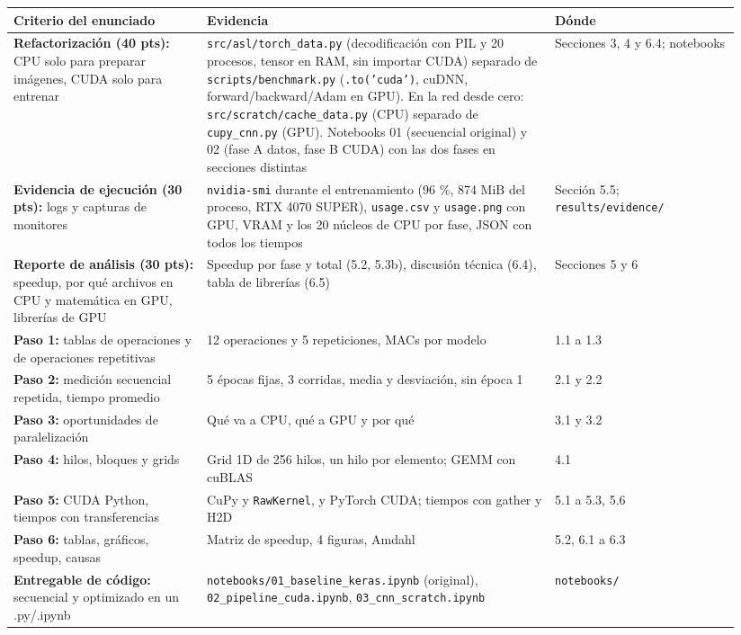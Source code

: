 \documentclass[
  11pt,
]{article}
\begin{document}
\begin{longtable}[]{@{}p{0.25\linewidth}p{0.45\linewidth}p{0.24\linewidth}@{}}
\toprule\noalign{}
Criterio del enunciado & Evidencia & Dónde \\
\midrule\noalign{}
\endhead
\bottomrule\noalign{}
\endlastfoot
\textbf{Refactorización (40 pts):} CPU solo para preparar imágenes, CUDA solo para entrenar & \texttt{src/asl/torch\_data.py} (decodificación con PIL y 20 procesos, tensor en RAM, sin importar CUDA) separado de \texttt{scripts/benchmark.py} (\texttt{.to('cuda')}, cuDNN, forward/backward/Adam en GPU). En la red desde cero: \texttt{src/scratch/cache\_data.py} (CPU) separado de \texttt{cupy\_cnn.py} (GPU). Notebooks 01 (secuencial original) y 02 (fase A datos, fase B CUDA) con las dos fases en secciones distintas & Secciones 3, 4 y 6.4; notebooks \\
\textbf{Evidencia de ejecución (30 pts):} logs y capturas de monitores & \texttt{nvidia-smi} durante el entrenamiento (96 \%, 874 MiB del proceso, RTX 4070 SUPER), \texttt{usage.csv} y \texttt{usage.png} con GPU, VRAM y los 20 núcleos de CPU por fase, JSON con todos los tiempos & Sección 5.5; \texttt{results/evidence/} \\
\textbf{Reporte de análisis (30 pts):} speedup, por qué archivos en CPU y matemática en GPU, librerías de GPU & Speedup por fase y total (5.2, 5.3b), discusión técnica (6.4), tabla de librerías (6.5) & Secciones 5 y 6 \\
\textbf{Paso 1:} tablas de operaciones y de operaciones repetitivas & 12 operaciones y 5 repeticiones, MACs por modelo & 1.1 a 1.3 \\
\textbf{Paso 2:} medición secuencial repetida, tiempo promedio & 5 épocas fijas, 3 corridas, media y desviación, sin época 1 & 2.1 y 2.2 \\
\textbf{Paso 3:} oportunidades de paralelización & Qué va a CPU, qué a GPU y por qué & 3.1 y 3.2 \\
\textbf{Paso 4:} hilos, bloques y grids & Grid 1D de 256 hilos, un hilo por elemento; GEMM con cuBLAS & 4.1 \\
\textbf{Paso 5:} CUDA Python, tiempos con transferencias & CuPy y \texttt{RawKernel}, y PyTorch CUDA; tiempos con gather y H2D & 5.1 a 5.3, 5.6 \\
\textbf{Paso 6:} tablas, gráficos, speedup, causas & Matriz de speedup, 4 figuras, Amdahl & 5.2, 6.1 a 6.3 \\
\textbf{Entregable de código:} secuencial y optimizado en un .py/.ipynb & \texttt{notebooks/01\_baseline\_keras.ipynb} (original), \texttt{02\_pipeline\_cuda.ipynb}, \texttt{03\_cnn\_scratch.ipynb} & \texttt{notebooks/} \\
\end{longtable}
\end{document}
